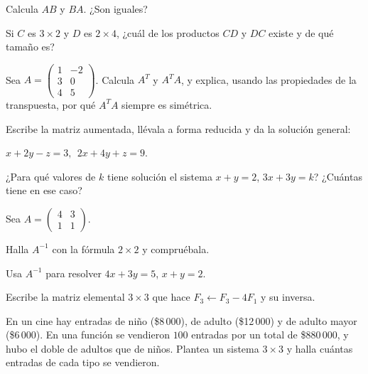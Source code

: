 \documentclass[11pt,a4paper]{article}
\begin{document}
\begin{ejercicios}[itemsep=6pt]
  \begin{ejercicios}
  \item Calcula $AB$ y $BA$. ¿Son iguales?
  \item Si $C$ es $3\times2$ y $D$ es $2\times4$, ¿cuál de los productos $CD$ y $DC$ existe y de qué tamaño es?
  \end{ejercicios}
\item Sea $A=\begin{pmatrix} 1 & -2\\ 3 & 0\\ 4 & 5 \end{pmatrix}$. Calcula $A^T$ y $A^TA$, y explica, usando las propiedades de la
  transpuesta, por qué $A^TA$ siempre es simétrica.
\item Escribe la matriz aumentada, llévala a forma reducida y da la solución general:
  \begin{ejercicios}
  \item $x+2y-z=3,\ \ 2x+4y+z=9$.
  \item ¿Para qué valores de $k$ tiene solución el sistema $x+y=2$, $3x+3y=k$? ¿Cuántas tiene en ese caso?
  \end{ejercicios}
\item Sea $A=\begin{pmatrix} 4 & 3\\ 1 & 1 \end{pmatrix}$.
  \begin{ejercicios}
  \item Halla $A^{-1}$ con la fórmula $2\times2$ y compruébala.
  \item Usa $A^{-1}$ para resolver $4x+3y=5$, $x+y=2$.
  \item Escribe la matriz elemental $3\times3$ que hace $F_3\leftarrow F_3-4F_1$ y su inversa.
  \end{ejercicios}
\item En un cine hay entradas de niño (\$8\,000), de adulto (\$12\,000) y de adulto mayor (\$6\,000). En una función
  se vendieron $100$ entradas por un total de \$880\,000, y hubo el doble de adultos que de niños. Plantea un sistema
  $3\times3$ y halla cuántas entradas de cada tipo se vendieron.
\end{ejercicios}
\end{document}
